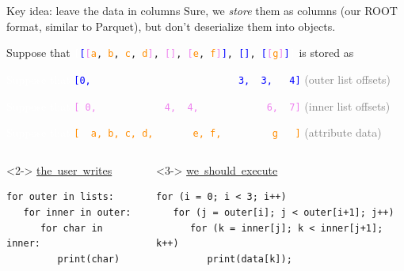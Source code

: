 \documentclass[aspectratio=169]{beamer}
\begin{document}
\begin{frame}[fragile]{Key idea: leave the data in columns}
\vspace{0.5 cm}
Sure, we {\it store} them as columns (our ROOT format, similar to Parquet), but don't deserialize them into objects.

\vspace{0.25 cm}
Suppose that {\tt\small \textcolor{white}{[}\textcolor{blue}{[}\textcolor{violet}{[}\textcolor{darkorange}{a}, \textcolor{darkorange}{b}, \textcolor{darkorange}{c}, \textcolor{darkorange}{d}\textcolor{violet}{]}, \textcolor{violet}{[]}, \textcolor{violet}{[}\textcolor{darkorange}{e}, \textcolor{darkorange}{f}\textcolor{violet}{]}\textcolor{blue}{]}, \textcolor{blue}{[]}, \textcolor{blue}{[}\textcolor{violet}{[}\textcolor{darkorange}{g}\textcolor{violet}{]}\textcolor{blue}{]}\textcolor{white}{]}} is stored as

\textcolor{white}{Suppose that}
             {\tt\small \textcolor{blue}{[0,\ \ \ \ \ \ \ \ \ \ \ \ \ \ \ \ \ \ \ \ \ \ \ \ \ \ 3,\ \ 3,\ \ \ 4]}} \textcolor{gray}{(outer list offsets)}

\textcolor{white}{Suppose that}
             {\tt\small \textcolor{violet}{[\ 0,\ \ \ \ \ \ \ \ \ \ \ \ 4,\ \ 4,\ \ \ \ \ \ \ \ \ \ \ \ 6,\ \ 7]}} \textcolor{gray}{(inner list offsets)}

\textcolor{white}{Suppose that}
             {\tt\small \textcolor{darkorange}{[\ \ a,\ b,\ c,\ d,\ \ \ \ \ \ \ e,\ f,\ \ \ \ \ \ \ \ \ g\ \ \ ]}} \textcolor{gray}{(attribute data)}

\vspace{0.5 cm}
\begin{columns}
\begin{uncoverenv}<2->
\mbox{\hspace{-0.1 cm}\underline{the user writes}}

\vspace{-0.25 cm}
\small
\begin{verbatim}
for outer in lists:
   for inner in outer:
      for char in inner:
         print(char)
\end{verbatim}
\end{uncoverenv}

\begin{uncoverenv}<3->
\mbox{\hspace{-0.1 cm}\underline{we should execute}}

\small
\vspace{-0.25 cm}
\begin{verbatim}
for (i = 0; i < 3; i++)
   for (j = outer[i]; j < outer[i+1]; j++)
      for (k = inner[j]; k < inner[j+1]; k++)
         print(data[k]);
\end{verbatim}
\end{uncoverenv}
\end{columns}

\vspace{0.5 cm}
\end{frame}
\end{document}
